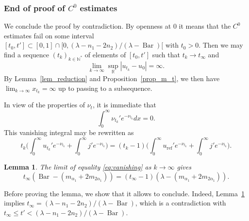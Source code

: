 \documentclass[10pt]{amsart}
\theoremstyle{plain}
\newtheorem{lem}[thm]{Lemma}
\theoremstyle{definition}
\DeclareMathOperator{\barDH}{Bar}
\begin{document}
\subsubsection{End of proof of $C^0$ estimates}

We conclude the proof by contradiction. By openness at $0$ it means that the
$C^0$ estimates fail on some interval
$[t_0,t']\subset [0,1]\cap [0,(\lambda-n_1-2n_2)/(\lambda-\barDH)[$
with $t_0>0$.
Then we may find a sequence $(t_k)_{k\in\mathbb{N}^*}$ of elements of $[t_0,t']$
such that $t_k\to t_{\infty}$ and
\begin{equation*}
\lim_{k\to \infty} \sup_{\mathbb{R}}|u_{t_k}-u_0| =\infty.
\end{equation*}
By Lemma~\ref{lem_reduction} and Proposition~\ref{prop_m_t},
we then have $\lim_{k\to \infty} x_{t_k}=\infty$
up to passing to a subsequence.

In view of the properties of $\nu_t$, it is immediate that
\begin{equation*}
\int_0^{\infty} \nu_{t_k}'e^{-\nu_{t_k}}dx =0.
\end{equation*}
This vanishing integral may be rewritten as
\begin{equation}
\label{eq:vanishing}
t_k\biggl(\int_0^{\infty}u_{t_k}'e^{-\nu_{t_k}}+\int_0^{\infty}j'e^{-\nu_{t_k}}\biggr)=
(t_k-1) \biggl(\int_0^{\infty}u_{\mathrm{ref}}'e^{-\nu_{t_k}}+\int_0^{\infty}j'e^{-\nu_{t_k}} \biggr).
\end{equation}

\begin{lem}
\label{lem_limits}
The limit of equality \eqref{eq:vanishing} as $k\to \infty$ gives
\begin{equation*}
t_{\infty}(\barDH-(m_{\alpha_1}+2m_{2\alpha_1}))=(t_{\infty}-1)(\lambda-(m_{\alpha_1}+2m_{2\alpha_1})).
\end{equation*}
\end{lem}

Before proving the lemma, we show that it allows to conclude.
Indeed, Lemma~\ref{lem_limits} implies $t_{\infty}=(\lambda-n_1-2n_2)/(\lambda-\barDH)$, which is
a contradiction with $t_{\infty}\leq t'<(\lambda-n_1-2n_2)/(\lambda-\barDH)$.
\end{document}
